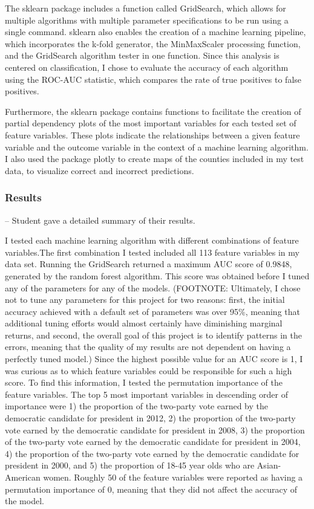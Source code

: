 \documentclass[11pt]{article}
\begin{document}
    The sklearn package includes a function called GridSearch, which allows
for multiple algorithms with multiple parameter specifications to be run
using a single command. sklearn also enables the creation of a machine
learning pipeline, which incorporates the k-fold generator, the
MinMaxScaler processing function, and the GridSearch algorithm tester in
one function. Since this analysis is centered on classification, I chose
to evaluate the accuracy of each algorithm using the ROC-AUC statistic,
which compares the rate of true positives to false positives.

    Furthermore, the sklearn package contains functions to facilitate the
creation of partial dependency plots of the most important variables for
each tested set of feature variables. These plots indicate the
relationships between a given feature variable and the outcome variable
in the context of a machine learning algorithm. I also used the package
plotly to create maps of the counties included in my test data, to
visualize correct and incorrect predictions.

    \hypertarget{results}{%
\subsubsection{Results}\label{results}}

-- Student gave a detailed summary of their results.

I tested each machine learning algorithm with different combinations of
feature variables.The first combination I tested included all 113
feature variables in my data set. Running the GridSearch returned a
maximum AUC score of 0.9848, generated by the random forest algorithm.
This score was obtained before I tuned any of the parameters for any of
the models. (FOOTNOTE: Ultimately, I chose not to tune any parameters
for this project for two reasons: first, the initial accuracy achieved
with a default set of parameters was over 95\%, meaning that additional
tuning efforts would almost certainly have diminishing marginal returns,
and second, the overall goal of this project is to identify patterns in
the errors, meaning that the quality of my results are not dependent on
having a perfectly tuned model.) Since the highest possible value for an
AUC score is 1, I was curious as to which feature variables could be
responsible for such a high score. To find this information, I tested
the permutation importance of the feature variables. The top 5 most
important variables in descending order of importance were 1) the
proportion of the two-party vote earned by the democratic candidate for
president in 2012, 2) the proportion of the two-party vote earned by the
democratic candidate for president in 2008, 3) the proportion of the
two-party vote earned by the democratic candidate for president in 2004,
4) the proportion of the two-party vote earned by the democratic
candidate for president in 2000, and 5) the proportion of 18-45 year
olds who are Asian-American women. Roughly 50 of the feature variables
were reported as having a permutation importance of 0, meaning that they
did not affect the accuracy of the model.
\end{document}
